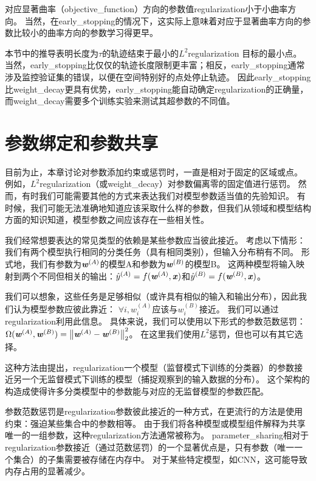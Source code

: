 对应显著曲率（\gls{objective_function}）方向的参数值\gls{regularization}小于小曲率方向。
当然，在\gls{early_stopping}的情况下，这实际上意味着对应于显著曲率方向的参数比较小的曲率方向的参数学习得更早。
 
本节中的推导表明长度为$\tau$的轨迹结束于最小的$L^2$\gls{regularization} 目标的最小点。
当然，\gls{early_stopping}比仅仅的轨迹长度限制更丰富；相反，\gls{early_stopping}通常涉及监控验证集的错误，以便在空间特别好的点处停止轨迹。
因此\gls{early_stopping}比\gls{weight_decay}更具有优势，\gls{early_stopping}能自动确定\gls{regularization}的正确量，而\gls{weight_decay}需要多个训练实验来测试其超参数的不同值。


\section{参数绑定和参数共享}
\label{sec:parameter_tying_and_parameter_sharing}
目前为止，本章讨论对参数添加约束或惩罚时，一直是相对于固定的区域或点。
例如，$L^2$\gls{regularization}（或\gls{weight_decay}）对参数偏离零的固定值进行惩罚。
然而，有时我们可能需要其他的方式来表达我们对模型参数适当值的先验知识。
有时候，我们可能无法准确地知道应该采取什么样的参数，但我们从领域和模型结构方面的知识知道，模型参数之间应该存在一些相关性。

我们经常想要表达的常见类型的依赖是某些参数应当彼此接近。
考虑以下情形：我们有两个模型执行相同的分类任务（具有相同类别），但输入分布稍有不同。
形式地，我们有参数为$\boldsymbol{\mathit{w}}^{(A)}$的模型A和参数为$\boldsymbol{\mathit{w}}^{(B)}$的模型B。
这两种模型将输入映射到两个不同但相关的输出：$\hat y^{(A)} = f(\boldsymbol{\mathit{w}}^{(A)}, \boldsymbol{\mathit{x}})$和$\hat y^{(B)} = f(\boldsymbol{\mathit{w}}^{(B)}, \boldsymbol{\mathit{x}})$。

我们可以想象，这些任务是足够相似（或许具有相似的输入和输出分布），因此我们认为模型参数应彼此靠近：
$\forall i, w_i^{(A)}$应该与$ w_i^{(B)}$接近。
我们可以通过\gls{regularization}利用此信息。
具体来说，我们可以使用以下形式的参数范数惩罚：
$\Omega(\boldsymbol{\mathit{w}}^{(A)}, \boldsymbol{\mathit{w}}^{(B)}) = \left\lVert\boldsymbol{\mathit{w}}^{(A)}-\boldsymbol{\mathit{w}}^{(B)}\right\rVert_2^2$。
在这里我们使用$L^2$惩罚，但也可以有其它选择。

这种方法由\cite{LasserreJ2006}提出，\gls{regularization}一个模型（监督模式下训练的分类器）的参数接近另一个无监督模式下训练的模型（捕捉观察到的输入数据的分布）。
这个架构的构造成使得许多分类模型中的参数能与对应的无监督模型的参数匹配。

参数范数惩罚是\gls{regularization}参数彼此接近的一种方式，在更流行的方法是使用约束：强迫某些集合中的参数相等。
由于我们将各种模型或模型组件解释为共享唯一的一组参数，这种\gls{regularization}方法通常被称为。
\gls{parameter_sharing}相对于\gls{regularization}参数接近（通过范数惩罚）的一个显著优点是，只有参数（唯一一个集合）的子集需要被存储在内存中。
对于某些特定模型，如\gls{CNN}，这可能导致内存占用的显著减少。


